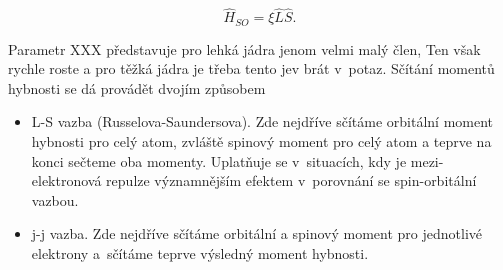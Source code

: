 \begin{equation}
\hat{H}_{SO} = \xi \hat{L} \hat{S}.
\label{rov:VE-67}
\end{equation}

\noindent Parametr XXX představuje pro lehká jádra jenom velmi malý člen, Ten však rychle roste a pro těžká jádra je třeba tento jev brát v~potaz. Sčítání momentů hybnosti se dá provádět dvojím způsobem

\begin{itemize}
\item L-S vazba (Russelova-Saundersova). Zde nejdříve sčítáme orbitální moment hybnosti pro celý atom, zvláště spinový moment pro celý atom a teprve na konci sečteme oba momenty. Uplatňuje se v~situacích, kdy je mezi-elektronová repulze významnějším efektem v~porovnání se spin-orbitální vazbou.  

\item j-j vazba. Zde nejdříve sčítáme orbitální a spinový moment pro jednotlivé elektrony a~sčítáme teprve výsledný moment hybnosti. 

\end{itemize}     



   
    


   

 



 




 
